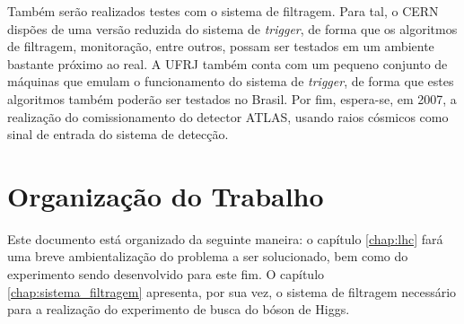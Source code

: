 Também serão realizados testes com o sistema de filtragem. Para tal, o CERN dispões de uma versão reduzida do sistema de \emph{trigger}, de forma que os algoritmos de filtragem, monitoração, entre outros, possam ser testados em um ambiente bastante próximo ao real. A UFRJ também conta com um pequeno conjunto de máquinas que emulam o funcionamento do sistema de \emph{trigger}, de forma que estes algoritmos também poderão ser testados no Brasil. Por fim, espera-se, em 2007, a realização do comissionamento do detector ATLAS, usando raios cósmicos como sinal de entrada do sistema de detecção.



\section{Organização do Trabalho}

Este documento está organizado da seguinte maneira: o capítulo \ref{chap:lhc} fará uma breve ambientalização do problema a ser solucionado, bem como do experimento sendo desenvolvido para este fim. O capítulo \ref{chap:sistema_filtragem} apresenta, por sua vez, o sistema de filtragem necessário para a realização do experimento de busca do bóson de Higgs. 